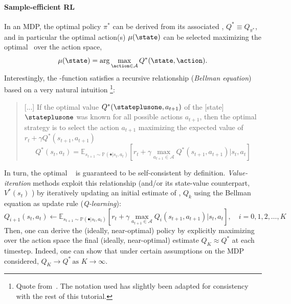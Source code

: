 \paragraph{Sample-efficient RL}
In an MDP, the optimal policy \( \pi^* \) can be derived from its associated \qfunction, \( Q^* \equiv Q_{\pi^*} \), and in particular the optimal action(s) \(\mu(\state)\) can be selected maximizing the optimal \qfunction \ over the action space,
\[
\mu(\state) = \arg \max_{\action \in \mathcal A} Q^*(\state, \action).
\]
Interestingly, the \qopt-function satisfies a recursive relationship (\emph{Bellman equation}) based on a very natural intuition%
\footnote{Quote from~\citet{mnihPlayingAtariDeep2013}. The notation used has slightly been adapted for consistency with the rest of this tutorial.}:
\begin{quote}
    [...] If the optimal value \( Q^*(\stateplusone, a_{t+1}) \) of the [state] \(\stateplusone \) was known for all possible actions \(a_{t+1} \), then the optimal strategy is to select the action \( a_{t+1}\) maximizing the expected value of \( r_t + \gamma Q^*(s_{t+1}, a_{t+1}) \)
\[ 
Q^*(s_t, a_t) = \mathbb E_{s_{t+1} \sim \mathbb P(\bullet \vert s_t, a_t)} \left[ r_t + \gamma \max_{a_{t+1} \in \mathcal A} Q^*(s_{t+1}, a_{t+1}) \big\vert s_t, a_t  \right]
\]
\end{quote}

In turn, the optimal \qfunction \ %
is guaranteed to be self-consistent by definition.
\emph{Value-iteration} methods exploit this relationship (and/or its state-value counterpart, \( V^*(s_t) \) ) by iteratively updating an initial estimate of \qopt, \( Q_k \) using the Bellman equation as update rule (\emph{Q-learning}):
\[
    Q_{i+1}(s_t, a_t) \leftarrow \mathbb E_{s_{t+1} \sim \mathbb P(\bullet \vert s_t, a_t)} \left[ r_t + \gamma \max_{a_{t+1} \in \mathcal A} Q_i (s_{t+1}, a_{t+1}) \big\vert s_t, a_t  \right],  \quad i=0,1,2,\dots,K
\]
Then, one can derive the (ideally, near-optimal) policy by explicitly maximizing over the action space the final (ideally, near-optimal) estimate \( Q_K \approx Q^* \) at each timestep. 
Indeed, one can show that under certain assumptions on the MDP considered, \( Q_K \to Q^* \, \text{as } K \to \infty \).

